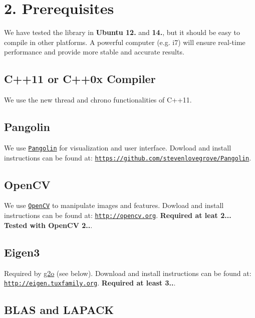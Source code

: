 \section*{2. Prerequisites}

We have tested the library in {\bfseries Ubuntu 12.} and {\bfseries 14.}, but it should be easy to compile in other platforms. A powerful computer (e.\+g. i7) will ensure real-\/time performance and provide more stable and accurate results.

\subsection*{C++11 or C++0x Compiler}

We use the new thread and chrono functionalities of C++11.

\subsection*{Pangolin}

We use \href{https://github.com/stevenlovegrove/Pangolin}{\tt Pangolin} for visualization and user interface. Dowload and install instructions can be found at\+: \href{https://github.com/stevenlovegrove/Pangolin}{\tt https\+://github.\+com/stevenlovegrove/\+Pangolin}.

\subsection*{Open\+CV}

We use \href{http://opencv.org}{\tt Open\+CV} to manipulate images and features. Dowload and install instructions can be found at\+: \href{http://opencv.org}{\tt http\+://opencv.\+org}. {\bfseries Required at leat 2... Tested with Open\+CV 2..}.

\subsection*{Eigen3}

Required by \mbox{\hyperlink{namespaceg2o}{g2o}} (see below). Download and install instructions can be found at\+: \href{http://eigen.tuxfamily.org}{\tt http\+://eigen.\+tuxfamily.\+org}. {\bfseries Required at least 3..}.

\subsection*{B\+L\+AS and L\+A\+P\+A\+CK}

